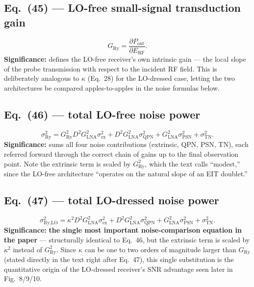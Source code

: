 \documentclass[11pt]{article}
\begin{document}
\subsection*{Eq.~(45) --- LO-free small-signal transduction gain}
\begin{equation}
G_\text{Ry} = \frac{\partial P_\text{out}}{\partial E_\text{RF}}. \tag{45}
\end{equation}
\textbf{Significance:} defines the LO-free receiver's own intrinsic
gain --- the local slope of the probe transmission with respect to the
incident RF field. This is deliberately analogous to $\kappa$
(Eq.~28) for the LO-dressed case, letting the two architectures be
compared apples-to-apples in the noise formulas below.

\subsection*{Eq.~(46) --- total LO-free noise power}
\begin{equation}
\sigma_\text{Ry}^2 = G_\text{Ry}^2D^2G_\text{LNA}^2\sigma_\text{ex}^2+D^2G_\text{LNA}^2\sigma_\text{QPN}^2+G_\text{LNA}^2\sigma_\text{PSN}^2+\sigma_\text{TN}^2. \tag{46}
\end{equation}
\textbf{Significance:} sums all four noise contributions (extrinsic,
QPN, PSN, TN), each referred forward through the correct chain of gains
up to the final observation point. Note the extrinsic term is scaled
by $G_\text{Ry}^2$, which the text calls ``modest,'' since the LO-free
architecture ``operates on the natural slope of an EIT doublet.''

\subsection*{Eq.~(47) --- total LO-dressed noise power}
\begin{equation}
\sigma_\text{Ry,LO}^2 = \kappa^2D^2G_\text{LNA}^2\sigma_\text{ex}^2+D^2G_\text{LNA}^2\sigma_\text{QPN}^2+G_\text{LNA}^2\sigma_\text{PSN}^2+\sigma_\text{TN}^2. \tag{47}
\end{equation}
\textbf{Significance:} \textbf{the single most important
noise-comparison equation in the paper} --- structurally identical to
Eq.~46, but the extrinsic term is scaled by $\kappa^2$ instead of
$G_\text{Ry}^2$. Since $\kappa$ can be one to two orders of magnitude
larger than $G_\text{Ry}$ (stated directly in the text right after
Eq.~47), this single substitution is the quantitative origin of the
LO-dressed receiver's SNR advantage seen later in Fig.~8/9/10.
\end{document}
